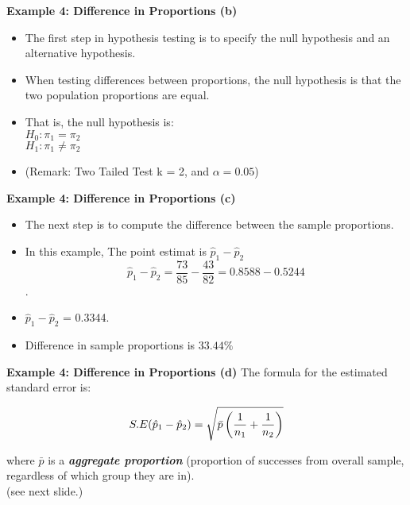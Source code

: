 
\noindent \textbf{Example 4: Difference in Proportions (b)}
\vspace{-1cm}
\begin{itemize}
\item
The first step in hypothesis testing is to specify the null hypothesis and an alternative hypothesis.
\item When testing differences between proportions, the null hypothesis is that the two population proportions are equal.
\item That is, the null hypothesis is:\\
$H_0: \pi_1 = \pi_2$\\
$H_1: \pi_1 \neq \pi_2$\\
\item (Remark: Two Tailed Test k = 2, and $\alpha = 0.05$)
\end{itemize}



\noindent \textbf{Example 4: Difference in Proportions (c)}
\vspace{-1cm}
\begin{itemize}
\item The next step is to compute the difference between the sample proportions.
\item In this example, The point estimat is $\hat{p}_1 - \hat{p}_2$ 
\[\hat{p}_1 - \hat{p}_2 = \frac{73}{85} - \frac{43}{82} = 0.8588 - 0.5244\].
\item $\hat{p}_1 - \hat{p}_2$ =  0.3344.
\item Difference in sample proportions is $33.44\%$
\end{itemize}





\noindent \textbf{Example 4: Difference in Proportions (d)}
\vspace{-1cm}
The formula for the estimated standard error is:

\[ S.E (\hat{p}_1 - \hat{p}_2)  = \sqrt{\bar{p} \left( {1 \over n_1} + {1 \over n_2}  \right)} \]


where $\bar{p}$ is a \textit{\textbf{aggregate proportion}} (proportion of successes from overall sample, regardless of which group they are in).
\\
(see next slide.)


